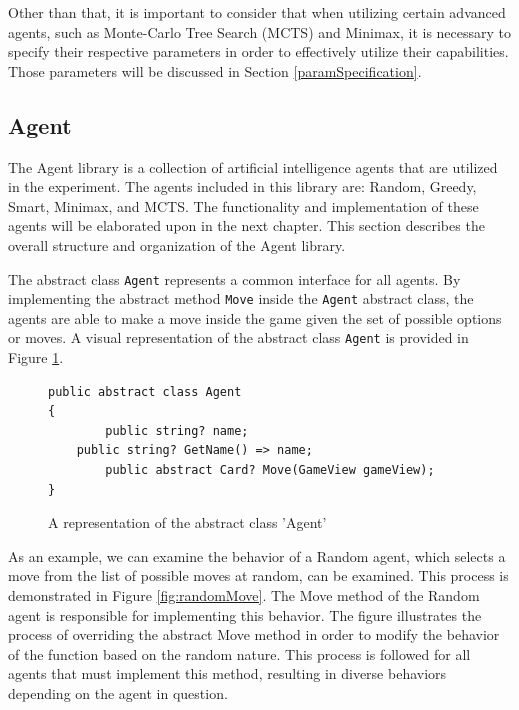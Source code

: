 Other than that, it is important to consider that when utilizing certain advanced agents, such as Monte-Carlo Tree Search (MCTS) and Minimax, it is necessary to specify their respective parameters in order to effectively utilize their capabilities. Those parameters will be discussed in Section \ref{paramSpecification}.

\subsection{Agent}

The Agent library is a collection of artificial intelligence agents that are utilized in the experiment. The agents included in this library are: Random, Greedy, Smart, Minimax, and MCTS. The functionality and implementation of these agents will be elaborated upon in the next chapter. This section describes the overall structure and organization of the Agent library.

The abstract class \texttt{Agent} represents a common interface for all agents. By implementing the abstract method \texttt{Move} inside the \texttt{Agent} abstract class, the agents are able to make a move inside the game given the set of possible options or moves. A visual representation of the abstract class \texttt{Agent} is provided in Figure \ref{fig:abstractClass}.

\begin{figure}[h]
\captionsetup{justification=centering}
\begin{lstlisting}
public abstract class Agent
{
    	public string? name;
	public string? GetName() => name;
    	public abstract Card? Move(GameView gameView);
}
\end{lstlisting}
\caption{A representation of the abstract class 'Agent'}
\label{fig:abstractClass}
\end{figure}

As an example, we can examine the behavior of a Random agent, which selects a move from the list of possible moves at random, can be examined. This process is demonstrated in Figure \ref{fig:randomMove}. The Move method of the Random agent is responsible for implementing this behavior. The figure illustrates the process of overriding the abstract Move method in order to modify the behavior of the function based on the random nature. This process is followed for all agents that must implement this method, resulting in diverse behaviors depending on the agent in question.